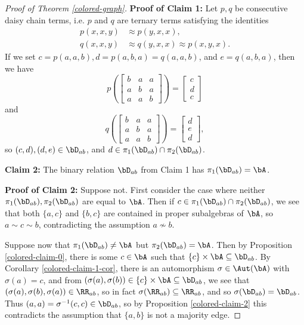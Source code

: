 \begin{proof}[Proof of Theorem \ref{colored-graph}]
{\bf Proof of Claim 1:} Let $p,q$ be consecutive daisy chain terms, i.e. $p$ and $q$ are ternary terms satisfying the identities
\begin{align*}
p(x,x,y) &\approx p(y,x,x),\\
q(x,x,y) &\approx q(y,x,x) \approx p(x,y,x).
\end{align*}
If we set $c = p(a,a,b), d = p(a,b,a) = q(a,a,b)$, and $e = q(a,b,a)$, then we have
\[
p\left(\begin{bmatrix} b & a & a\\ a & b & a\\ a & a & b\end{bmatrix}\right) = \begin{bmatrix} c\\ d\\ c\end{bmatrix}
\]
and
\[
q\left(\begin{bmatrix} b & a & a\\ a & b & a\\ a & a & b\end{bmatrix}\right) = \begin{bmatrix} d\\ e\\ d\end{bmatrix},
\]
so $(c,d), (d,e) \in \bD_{ab}$, and $d \in \pi_1(\bD_{ab}) \cap \pi_2(\bD_{ab})$.

{\bf Claim 2:} The binary relation $\bD_{ab}$ from Claim 1 has $\pi_1(\bD_{ab}) = \bA$.

{\bf Proof of Claim 2:} Suppose not. First consider the case where neither $\pi_1(\bD_{ab}), \pi_2(\bD_{ab})$ are equal to $\bA$. Then if $c \in \pi_1(\bD_{ab}) \cap \pi_2(\bD_{ab})$, we see that both $\{a,c\}$ and $\{b,c\}$ are contained in proper subalgebras of $\bA$, so $a \sim c \sim b$, contradicting the assumption $a \not\sim b$.

Suppose now that $\pi_1(\bD_{ab}) \ne \bA$ but $\pi_2(\bD_{ab}) = \bA$. Then by Proposition \ref{colored-claim-0}, there is some $c \in \bA$ such that $\{c\} \times \bA \subseteq \bD_{ab}$. By Corollary \ref{colored-claim-1-cor}, there is an automorphism $\sigma \in \Aut(\bA)$ with $\sigma(a) = c$, and from $(\sigma(a),\sigma(b)) \in \{c\}\times\bA \subseteq \bD_{ab}$, we see that $(\sigma(a),\sigma(b),\sigma(a)) \in \RR_{ab}$, so in fact $\sigma(\RR_{ab}) \subseteq \RR_{ab}$, and so $\sigma(\bD_{ab}) = \bD_{ab}$. Thus $(a,a) = \sigma^{-1}(c,c) \in \bD_{ab}$, so by Proposition \ref{colored-claim-2} this contradicts the assumption that $\{a,b\}$ is not a majority edge.


\end{proof}
